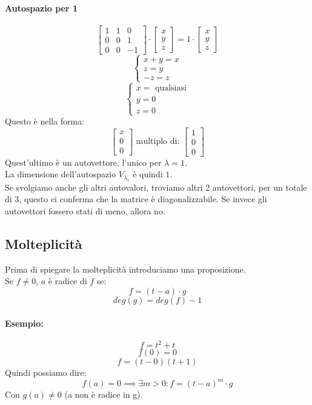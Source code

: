 \documentclass[12pt,a4paper]{article}
\begin{document}
\paragraph{Autospazio per 1}
\[
\begin{bmatrix}
  1 & 1 & 0\\
  0 & 0 & 1\\
  0 & 0 & -1
\end{bmatrix} \cdot \begin{bmatrix}
  x\\
  y\\
  z
\end{bmatrix} = 1 \cdot \begin{bmatrix}
  x\\
  y\\
  z
\end{bmatrix}
\]
\[
\begin{cases}
  x + y = x\\
  z = y\\
  -z = z
\end{cases}
\]
\[
\begin{cases}
  x = \text{ qualsiasi}\\
  y = 0\\
  z = 0
\end{cases}
\]
Questo è nella forma:
\[
\begin{bmatrix}
  x\\
  0\\
  0
\end{bmatrix} \text{ multiplo di: } \begin{bmatrix}
  1\\
  0\\
  0
\end{bmatrix}
\]
Quest'ultimo è un autovettore, l'unico per $\lambda = 1$.\\
La dimensione dell'autospazio $V_{\lambda_1}$ è quindi $1$.\\
Se svolgiamo anche gli altri autovalori, troviamo altri 2 autovettori, per un totale di 3, questo ci conferma che la matrice è diagonalizzabile.
Se invece gli autovettori fossero stati di meno, allora no.
\subsection{Molteplicità}
Prima di spiegare la molteplicità introduciamo una proposizione.\\
Se $f \ne 0$, $a$ è radice di $f$ se:
\[
f = (t - a) \cdot g
\] 
\[
deg(g) = deg(f) - 1
\]
\paragraph{Esempio:}
\[
f = t^2 + t
\]
\[
f(0) = 0
\]
\[
f = (t - 0)(t + 1)
\]
Quindi possiamo dire:
\[
f(a) = 0 \implies \exists m > 0 : f = (t - a)^m \cdot g
\]
Con $g(a) \ne 0$ (a non è radice in g).
\end{document}
